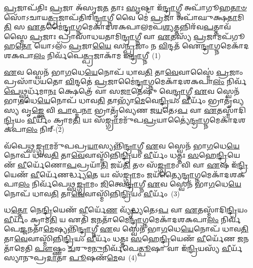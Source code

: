 \setcounter{anuvakam}{0}
\-\ul{𑌪𑍍𑌰}\-𑌜𑌾𑌪᳴𑌤𑌿𑌃 \ul{𑌪𑍍𑌰}\-𑌜𑌾 𑌅᳴𑌸𑍃𑌜\-\ul{𑌤} 𑌤𑌾𑌃 \ul{𑌸𑍃}\-𑌷𑍍𑌟𑌾 𑌇᳴\-\ul{𑌨𑍍𑌦𑍍𑌰𑌾}\-𑌗𑍍𑌨𑍀 𑌅𑌪𑌾᳴𑌗𑍂𑌹\-\ul{𑌤𑌾}\-\-\ul{𑍞} 𑌸𑍋᳴\-𑌽𑌚𑌾𑌯\-\ul{𑌤𑍍𑌪𑍍𑌰}\-𑌜𑌾𑌪᳴𑌤𑌿𑌰𑌿\-\ul{𑌨𑍍𑌦𑍍𑌰𑌾}\-𑌗𑍍𑌨𑍀 𑌵𑍈 𑌮𑍇॑ \ul{𑌪𑍍𑌰}\-𑌜𑌾 𑌅𑌪𑌾᳴𑌘𑍁𑌕𑍍𑌷\-\ul{𑌤𑌾}\-𑌮𑌿\-\ul{𑌤𑌿} 𑌸 \ul{𑌏}\-𑌤𑌮𑍈॑\-\ul{𑌨𑍍𑌦𑍍𑌰𑌾}\-𑌗𑍍𑌨𑌮𑍇𑌕𑌾᳴\-𑌦𑌶\-𑌕𑌪𑌾𑌲𑌮𑌪\-\ul{𑌶𑍍𑌯}\-𑌤𑍍𑌤𑌨𑍍𑌨𑌿𑌰᳴𑌵\-\ul{𑌪}\-𑌤𑍍𑌤𑌾𑌵᳴𑌸𑍍𑌮𑍈 \ul{𑌪𑍍𑌰}\-𑌜𑌾𑌃 𑌪𑍍𑌰𑌾𑌸𑌾᳴𑌧𑌯𑌤𑌾𑌮𑌿\-\ul{𑌨𑍍𑌦𑍍𑌰𑌾}\-𑌗𑍍𑌨𑍀 𑌵𑌾 \ul{𑌏}\-𑌤𑌸𑍍𑌯᳴ \ul{𑌪𑍍𑌰}\-𑌜𑌾𑌮𑌪᳴𑌗𑍂𑌹\-\ul{𑌤𑍋} 𑌯𑍋\-𑌽𑌲𑌂᳴ \ul{𑌪𑍍𑌰}\-𑌜𑌾\-\ul{𑌯𑍈} 𑌸\-\ul{𑌨𑍍𑌪𑍍𑌰}\-𑌜𑌾𑌂 𑌨 \ul{𑌵𑌿}\-𑌨𑍍𑌦𑌤᳴ 𑌐\-\ul{𑌨𑍍𑌦𑍍𑌰𑌾}\-𑌗𑍍𑌨𑌮𑍇𑌕𑌾᳴\-𑌦𑌶\-𑌕𑌪𑌾\-\ul{𑌲𑌂} 𑌨𑌿𑌰𑍍𑌵᳴𑌪𑍇\-\ul{𑌤𑍍𑌪𑍍𑌰}\-𑌜𑌾𑌕𑌾᳴𑌮 𑌇\-\ul{𑌨𑍍𑌦𑍍𑌰𑌾}\-𑌗𑍍𑌨𑍀~(1)

\-\ul{𑌏}\-𑌵 𑌸𑍍𑌵𑍇𑌨᳴ 𑌭𑌾\-\ul{𑌗}\-𑌧𑍇\-\ul{𑌯𑍇}\-𑌨𑍋𑌪᳴ 𑌧𑌾𑌵\-\ul{𑌤𑌿} 𑌤𑌾\-\ul{𑌵𑍇}\-𑌵𑌾𑌸𑍍𑌮𑍈॑ \ul{𑌪𑍍𑌰}\-𑌜𑌾𑌂 𑌪𑍍𑌰𑌸𑌾᳴𑌧𑌯𑌤𑍋 \ul{𑌵𑌿}\-𑌨𑍍𑌦𑌤𑍇॑ \ul{𑌪𑍍𑌰}\-𑌜𑌾𑌮𑍈॑\-\ul{𑌨𑍍𑌦𑍍𑌰𑌾}\-𑌗𑍍𑌨𑌮𑍇𑌕𑌾᳴\-𑌦𑌶\-𑌕𑌪𑌾\-\ul{𑌲𑌂} 𑌨𑌿𑌰𑍍𑌵᳴\-\ul{𑌪𑍇}\-𑌥𑍍𑌸𑍍𑌪𑌰𑍍𑌧᳴𑌮𑌾\-\ul{𑌨𑌃} 𑌕𑍍𑌷𑍇𑌤𑍍𑌰𑍇᳴ 𑌵𑌾 𑌸\-\ul{𑌜𑌾}\-𑌤𑍇𑌷𑍁᳴ 𑌵𑍇\-\ul{𑌨𑍍𑌦𑍍𑌰𑌾}\-𑌗𑍍𑌨𑍀 \ul{𑌏}\-𑌵 𑌸𑍍𑌵𑍇𑌨᳴ 𑌭𑌾\-\ul{𑌗}\-𑌧𑍇\-\ul{𑌯𑍇}\-𑌨𑍋𑌪᳴ 𑌧𑌾𑌵\-\ul{𑌤𑌿} 𑌤𑌾𑌭𑍍𑌯𑌾᳴\-\ul{𑌮𑍇}\-𑌵𑍇\-\ul{𑌨𑍍𑌦𑍍𑌰𑌿}\-𑌯𑌂 \ul{𑌵𑍀}\-𑌰𑍍𑌯𑌂᳴ 𑌭𑍍𑌰𑌾𑌤𑍃᳴𑌵𑍍𑌯𑌸𑍍𑌯 𑌵𑍃\-\ul{𑌙𑍍𑌕𑍍𑌤𑍇} 𑌵𑌿 \ul{𑌪𑌾}\-𑌪𑍍𑌮\-\ul{𑌨𑌾} 𑌭𑍍𑌰𑌾𑌤𑍃᳴𑌵𑍍𑌯𑍇𑌣 𑌜\-\ul{𑌯}\-𑌤𑍇\-𑌽\-\ul{𑌪} 𑌵𑌾 \ul{𑌏}\-𑌤𑌸𑍍𑌮𑌾᳴𑌦𑌿\-\ul{𑌨𑍍𑌦𑍍𑌰𑌿}\-𑌯𑌂 \ul{𑌵𑍀}\-𑌰𑍍𑌯𑌂᳴ 𑌕𑍍𑌰𑌾𑌮\-\ul{𑌤𑌿} 𑌯𑌃 𑌸᳴\-\ul{𑌙𑍍𑌗𑍍𑌰𑌾}\-𑌮𑌮𑍁᳴𑌪\-\ul{𑌪𑍍𑌰}\-𑌯𑌾𑌤𑍍𑌯𑍈॑\-\ul{𑌨𑍍𑌦𑍍𑌰𑌾}\-𑌗𑍍𑌨𑌮𑍇𑌕𑌾᳴\-𑌦𑌶\-𑌕𑌪𑌾\-\ul{𑌲𑌂} 𑌨𑌿𑌰𑍍-(2)

𑌵᳴𑌪𑍇𑌥𑍍𑌸\-\ul{𑌙𑍍𑌗𑍍𑌰𑌾}\-𑌮𑌮𑍁᳴𑌪𑌪𑍍𑌰\-\ul{𑌯𑌾}\-𑌸𑍍𑌯𑌨𑍍𑌨𑌿᳴\-\ul{𑌨𑍍𑌦𑍍𑌰𑌾}\-𑌗𑍍𑌨𑍀 \ul{𑌏}\-𑌵 𑌸𑍍𑌵𑍇𑌨᳴ 𑌭𑌾\-\ul{𑌗}\-𑌧𑍇\-\ul{𑌯𑍇}\-𑌨𑍋𑌪᳴ 𑌧𑌾𑌵\-\ul{𑌤𑌿} 𑌤𑌾\-\ul{𑌵𑍇}\-𑌵𑌾𑌸𑍍𑌮𑌿᳴𑌨𑍍𑌨𑌿\-\ul{𑌨𑍍𑌦𑍍𑌰𑌿}\-𑌯𑌂 \ul{𑌵𑍀}\-𑌰𑍍𑌯𑌂᳴ 𑌧𑌤𑍍𑌤𑌃 \ul{𑌸}\-𑌹𑍇\-\ul{𑌨𑍍𑌦𑍍𑌰𑌿}\-𑌯𑍇𑌣᳴ \ul{𑌵𑍀}\-𑌰𑍍𑌯𑍇᳴𑌣𑍋\-\ul{𑌪}\-𑌪𑍍𑌰𑌯𑌾᳴\-\ul{𑌤𑌿} 𑌜𑌯᳴\-\ul{𑌤𑌿} 𑌤𑍞 𑌸᳴\-\ul{𑌙𑍍𑌗𑍍𑌰𑌾}\-𑌮𑌂 𑌵𑌿 𑌵𑌾 \ul{𑌏}\-𑌷 𑌇᳴\-\ul{𑌨𑍍𑌦𑍍𑌰𑌿}\-𑌯𑍇𑌣᳴ \ul{𑌵𑍀}\-𑌰𑍍𑌯𑍇᳴𑌣𑌰𑍍𑌦𑍍𑌧𑍍𑌯\-\ul{𑌤𑍇} 𑌯𑌃 𑌸᳴\-\ul{𑌙𑍍𑌗𑍍𑌰𑌾}\-𑌮𑌂 𑌜𑌯᳴𑌤𑍍𑌯𑍈\-\ul{𑌨𑍍𑌦𑍍𑌰𑌾}\-𑌗𑍍𑌨𑌮𑍇𑌕𑌾᳴\-𑌦𑌶\-𑌕𑌪𑌾\-\ul{𑌲𑌂} 𑌨𑌿𑌰𑍍𑌵᳴𑌪𑍇𑌥𑍍𑌸\-\ul{𑌙𑍍𑌗𑍍𑌰𑌾}\-𑌮𑌂 \ul{𑌜𑌿}\-𑌤𑍍𑌵𑍇\-\ul{𑌨𑍍𑌦𑍍𑌰𑌾}\-𑌗𑍍𑌨𑍀 \ul{𑌏}\-𑌵 𑌸𑍍𑌵𑍇𑌨᳴ 𑌭𑌾\-\ul{𑌗}\-𑌧𑍇\-\ul{𑌯𑍇}\-𑌨𑍋𑌪᳴ 𑌧𑌾𑌵\-\ul{𑌤𑌿} 𑌤𑌾\-\ul{𑌵𑍇}\-𑌵𑌾𑌸𑍍𑌮𑌿᳴𑌨𑍍𑌨𑌿\-\ul{𑌨𑍍𑌦𑍍𑌰𑌿}\-𑌯𑌂 \ul{𑌵𑍀}\-𑌰𑍍𑌯𑌂᳴~(3)

𑌧\-\ul{𑌤𑍍𑌤𑍋} 𑌨𑍇\-\ul{𑌨𑍍𑌦𑍍𑌰𑌿}\-𑌯𑍇𑌣᳴ \ul{𑌵𑍀}\-𑌰𑍍𑌯𑍇᳴\-\ul{𑌣} 𑌵𑍍𑌯𑍃᳴\-\ul{𑌦𑍍𑌧𑍍𑌯}\-𑌤𑍇\-𑌽\-\ul{𑌪} 𑌵𑌾 \ul{𑌏}\-𑌤𑌸𑍍𑌮𑌾᳴𑌦𑌿\-\ul{𑌨𑍍𑌦𑍍𑌰𑌿}\-𑌯𑌂 \ul{𑌵𑍀}\-𑌰𑍍𑌯𑌂᳴ 𑌕𑍍𑌰𑌾𑌮\-\ul{𑌤𑌿} 𑌯 𑌏𑌤𑌿᳴ \ul{𑌜}\-𑌨𑌤𑌾᳴𑌮𑍈\-\ul{𑌨𑍍𑌦𑍍𑌰𑌾}\-𑌗𑍍𑌨𑌮𑍇𑌕𑌾᳴\-𑌦𑌶\-𑌕𑌪𑌾\-\ul{𑌲𑌂} 𑌨𑌿𑌰𑍍𑌵᳴𑌪𑍇\-\ul{𑌜𑍍𑌜}\-𑌨𑌤𑌾᳴\-\-\ul{𑌮𑍇}\-𑌷𑍍𑌯𑌨𑍍𑌨𑌿᳴\-\ul{𑌨𑍍𑌦𑍍𑌰𑌾}\-𑌗𑍍𑌨𑍀 \ul{𑌏}\-𑌵 𑌸𑍍𑌵𑍇𑌨᳴ 𑌭𑌾\-\ul{𑌗}\-𑌧𑍇\-\ul{𑌯𑍇}\-𑌨𑍋𑌪᳴ 𑌧𑌾𑌵\-\ul{𑌤𑌿} 𑌤𑌾\-\ul{𑌵𑍇}\-𑌵𑌾𑌸𑍍𑌮𑌿᳴𑌨𑍍𑌨𑌿\-\ul{𑌨𑍍𑌦𑍍𑌰𑌿}\-𑌯𑌂 \ul{𑌵𑍀}\-𑌰𑍍𑌯𑌂᳴ 𑌧𑌤𑍍𑌤𑌃 \ul{𑌸}\-𑌹𑍇\-\ul{𑌨𑍍𑌦𑍍𑌰𑌿}\-𑌯𑍇𑌣᳴ \ul{𑌵𑍀}\-𑌰𑍍𑌯𑍇᳴𑌣 \ul{𑌜}\-𑌨𑌤𑌾᳴𑌮𑍇𑌤𑌿 \ul{𑌪𑍗}\-𑌷𑍍𑌣𑌂 \ul{𑌚}\-𑌰𑍁𑌮\-\ul{𑌨𑍁}\-𑌨𑌿𑌰𑍍𑌵᳴𑌪𑍇\-\ul{𑌤𑍍𑌪𑍂}\-𑌷𑌾 𑌵𑌾 𑌇᳴\-\ul{𑌨𑍍𑌦𑍍𑌰𑌿}\-𑌯𑌸𑍍𑌯᳴ \ul{𑌵𑍀}\-𑌰𑍍𑌯᳴𑌸𑍍𑌯𑌾𑌨𑍁𑌪𑍍𑌰\-\ul{𑌦𑌾}\-𑌤𑌾 \ul{𑌪𑍂}\-𑌷𑌣᳴\-\ul{𑌮𑍇}\-𑌵~(4)

